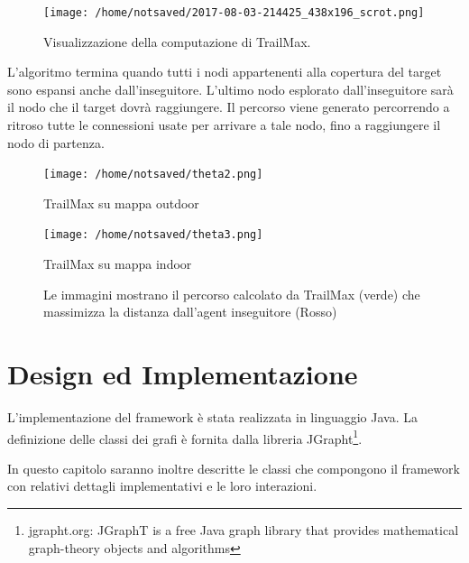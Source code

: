 \documentclass[12pt]{book}
\begin{document}
\begin{figure}[htp]
\centering
\texttt{[image: /home/notsaved/2017-08-03-214425\_438x196\_scrot.png]}
\caption{Visualizzazione della computazione di TrailMax.}
\label{trailmaxexp}
\end{figure}
\par{L'algoritmo termina quando tutti i nodi appartenenti alla copertura del target sono espansi anche dall'inseguitore. L'ultimo nodo esplorato dall'inseguitore sar\`a il nodo che il target dovr\`a raggiungere. Il percorso viene generato percorrendo a ritroso tutte le connessioni usate per arrivare a tale nodo, fino a raggiungere il nodo di partenza.}

\begin{figure}[H]
  \texttt{[image: /home/notsaved/theta2.png]}
  \caption{TrailMax su mappa outdoor}
  \label{fig:trailmax_outdoor}
\endminipage\hfill
{}%
  \texttt{[image: /home/notsaved/theta3.png]}
  \caption{TrailMax su mappa indoor}\label{fig:trailmax_indoor}
\endminipage
\caption{Le immagini mostrano il percorso calcolato da TrailMax (verde) che massimizza la distanza dall'agent inseguitore (Rosso)}
\end{figure}

\chapter{Design ed Implementazione}
\par{L'implementazione del framework \`e stata realizzata in linguaggio Java. La definizione delle classi dei grafi \`e fornita dalla libreria JGrapht\footnote{jgrapht.org: JGraphT is a free Java graph library that provides mathematical graph-theory objects and algorithms}. }
\par{In questo capitolo saranno inoltre descritte le classi che compongono il framework con relativi dettagli implementativi e le loro interazioni.}
\end{document}
